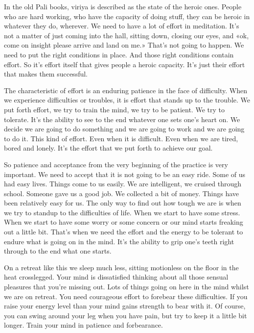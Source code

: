\documentclass[letterpaper,10pt,english]{sphinxmanual}
\begin{document}
\sphinxAtStartPar
In the old Pali books, viriya is described as the state of the heroic ones.
People who are hard working, who have the capacity of doing stuff, they can
be heroic in whatever they do, wherever. We need to have a lot of effort in
meditation. It’s not a matter of just coming into the hall, sitting down, closing our eyes, and «ok, come on insight please arrive and land on me.» That’s
  not going to happen. We need to put the right conditions in place. And those
right conditions contain effort. So it’s effort itself that gives people a heroic
capacity. It’s just their effort that makes them successful.

\sphinxAtStartPar
The characteristic of effort is an enduring patience in the face of difficulty. When we experience difficulties or troubles, it is effort that stands
up to the trouble. We put forth effort, we try to train the mind, we try to be
patient. We try to tolerate. It’s the ability to see to the end whatever one sets
one’s heart on. We decide we are going to do something and we are going to
work and we are going to do it. This kind of effort. Even when it is difficult.
Even when we are tired, bored and lonely. It’s the effort that we put forth to
achieve our goal.

\sphinxAtStartPar
So  patience  and  acceptance  from  the  very  beginning  of  the  practice
is very important. We need to accept that it is not going to be an easy ride.
Some of us had easy lives. Things come to us easily. We are intelligent, we
cruised through school. Someone gave us a good job. We collected a bit of
money. Things have been relatively easy for us. The only way to find out
how tough we are is when we try to stand\sphinxhyphen{}up to the difficulties of life. When
we  start  to  have  some  stress. When  we  start  to  have  some  worry  or  some
concern or our mind starts freaking out a little bit. That’s when we need the
effort and the energy to be tolerant to endure what is going on in the mind.
It’s the ability to grip one’s teeth right through to the end what one starts.

\sphinxAtStartPar
On a retreat like this we sleep much less, sitting motionless on the floor
in the heat cross\sphinxhyphen{}legged. Your mind is dissatisfied thinking about all those
sensual pleasures that you’re missing out. Lots of things going on here in the
mind whilst we are on retreat. You need courageous effort to forebear these
difficulties. If you raise your energy level than your mind gains strength to
bear with it. Of course, you can swing around your leg when you have pain,
but try to keep it a little bit longer. Train your mind in patience and forbearance.
\end{document}
